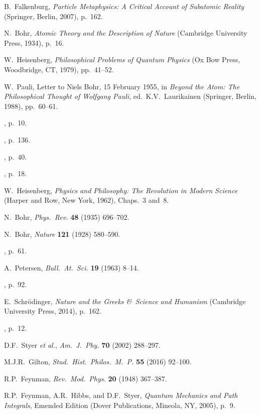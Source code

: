\documentclass[smallextended]{svjour3}
\begin{document}
\begin{thebibliography}{99}
 B.\ Falkenburg, \textit{Particle Metaphysics: A Critical Account of Subatomic Reality} (Springer, Berlin, 2007), p.~162.

 N.\ Bohr, \emph{Atomic Theory and the Description of Nature} (Cambridge University Press, 1934), p.~16.

 W.\ Heisenberg, \textit{Philosophical Problems of Quantum Physics} (Ox Bow Press, Woodbridge, CT, 1979), pp.\ 41--52.

 W.\ Pauli, Letter to Niels Bohr, 15 February 1955, in \textit{Beyond the Atom: The Philosophical Thought of Wolfgang Pauli}, ed.\ K.V.\ Laurikainen (Springer, Berlin, 1988), pp.\ 60--61.

 \cite{Bohr-EAPHK}, p.~10.

 \cite{KantCPR1}, p.~136.

 \cite{Bohr-APHK}, p.~40.

 \cite{BohrATDN}, p.~18.

 W.\ Heisenberg, \textit{Physics and Philosophy: The Revolution in Modern Science} (Harper and Row, New York, 1962), Chaps.\ 3 and~8.

 N.\ Bohr, \textit{Phys.\ Rev.} \textbf{48} (1935) 696--702.

 N.\ Bohr, \textit{Nature} \textbf{121} (1928) 580--590.

 \cite{Bohr-APHK}, p.~61.

 A.\ Petersen, \textit{Bull.\ At.\ Sci.} \textbf{19} (1963) 8--14.

 \cite{BohrE58-62}, p.~92.

 E.\ Schr\"odinger, \textit{Nature and the Greeks \&\ Science and Humanism} (Cambridge University Press, 2014), p.~162.

 \cite{Bohr-EAPHK}, p.~12.

 D.F.\ Styer \emph{et al.}, \textit{Am.\ J.\ Phy.} \textbf{70} (2002) 288--297.

 M.J.R.\ Gilton, \textit{Stud.\ Hist.\ Philos.\ M.\ P.} \textbf{55} (2016) 92--100.

 R.P.\ Feynman, \emph{Rev.\ Mod.\ Phys.} \textbf{20} (1948) 367--387.

 R.P.\ Feynman, A.R.\ Hibbs, and D.F.\ Styer, \emph{Quantum Mechanics and Path Integrals}, Emended Edition (Dover Publications, Mineola, NY, 2005), p.~9.


\end{thebibliography}
\end{document}
